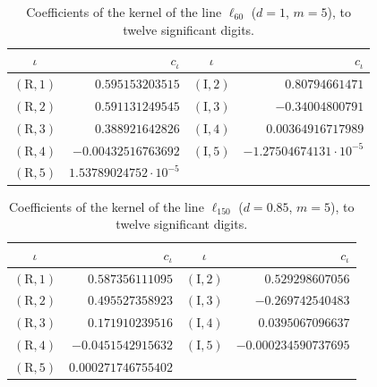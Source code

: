 \documentclass[11pt,reqno]{amsart}
\numberwithin{equation}{section}
\theoremstyle{definition}
\theoremstyle{remark}
\begin{document}
\begin{table}[ht]\centering\small
\begin{tabular}{@{}cr@{\quad}cr@{}}\toprule $\iota$ & $c_\iota$ & $\iota$ & $c_\iota$\\\midrule
$(\mathrm R,1)$ & $0.595153203515$ & $(\mathrm I,2)$ & $0.80794661471$\\
$(\mathrm R,2)$ & $0.591131249545$ & $(\mathrm I,3)$ & $-0.34004800791$\\
$(\mathrm R,3)$ & $0.388921642826$ & $(\mathrm I,4)$ & $0.00364916717989$\\
$(\mathrm R,4)$ & $-0.00432516763692$ & $(\mathrm I,5)$ & $-1.27504674131\cdot10^{-5}$\\
$(\mathrm R,5)$ & $1.53789024752\cdot10^{-5}$ & & \\
\bottomrule\end{tabular}
\caption{Coefficients of the kernel of the line $\ell_{60}$ ($d=1$, $m=5$), to twelve significant digits.}\label{tab:kernel_L60}\end{table}

\begin{table}[ht]\centering\small
\begin{tabular}{@{}cr@{\quad}cr@{}}\toprule $\iota$ & $c_\iota$ & $\iota$ & $c_\iota$\\\midrule
$(\mathrm R,1)$ & $0.587356111095$ & $(\mathrm I,2)$ & $0.529298607056$\\
$(\mathrm R,2)$ & $0.495527358923$ & $(\mathrm I,3)$ & $-0.269742540483$\\
$(\mathrm R,3)$ & $0.171910239516$ & $(\mathrm I,4)$ & $0.0395067096637$\\
$(\mathrm R,4)$ & $-0.0451542915632$ & $(\mathrm I,5)$ & $-0.000234590737695$\\
$(\mathrm R,5)$ & $0.000271746755402$ & & \\
\bottomrule\end{tabular}
\caption{Coefficients of the kernel of the line $\ell_{150}$ ($d=0.85$, $m=5$), to twelve significant digits.}\label{tab:kernel_L150}\end{table}
\end{document}
